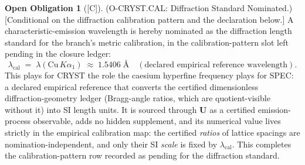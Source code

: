 \documentclass[12pt,oneside]{amsbook}
\theoremstyle{plain}
\theoremstyle{definition}
\newtheorem{obligation}[theorem]{Open Obligation}
\theoremstyle{remark}
\newcommand{\status}[1]{\textup{[#1]}}
\begin{document}
\begin{obligation}[\status{C}]\label{ob:cryst-diffraction-standard}
\textup{(O-CRYST.CAL: Diffraction Standard Nominated.)}
\textup{[Conditional on the diffraction calibration pattern and the
declaration below.]}
A characteristic-emission wavelength is hereby nominated as the
diffraction length standard for the branch's metric calibration, in
the calibration-pattern slot left pending in the closure ledger:
\[
  \lambda_{\mathrm{cal}} \;=\; \lambda(\mathrm{Cu}\,K\alpha_1)
  \;\approx\; 1.5406\;\text{\AA}
  \quad(\text{declared empirical reference wavelength}).
\]
This plays for CRYST the role the caesium hyperfine frequency plays
for SPEC: a declared empirical reference that converts the certified
dimensionless diffraction-geometry ledger (Bragg-angle ratios, which
are quotient-visible without it) into SI length units.  It is sourced
through $\mathbf{U}$ as a certified emission-process observable, adds
no hidden supplement, and its numerical value lives strictly in the
empirical calibration map: the certified \emph{ratios} of lattice
spacings are nomination-independent, and only their SI \emph{scale}
is fixed by $\lambda_{\mathrm{cal}}$.  This completes the
calibration-pattern row recorded as pending for the diffraction
standard.
\end{obligation}
\end{document}
